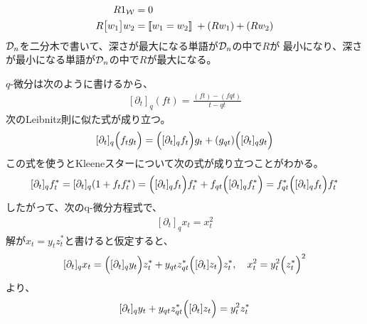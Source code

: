 {\begin{todo}[残りの話題]
\begin{description}
		\begin{equation*}\begin{split}
			R 1_{{\mathcal{W}}} &= 0 \\
			R \bigl[{w_1}\bigr] w_2 &= [\![w_1=w_2]\!]\; + (Rw_1) + (Rw_2) \\
		\end{split}\end{equation*}
		${{\mathcal{D}}}_n$を二分木で書いて、深さが最大になる単語が${{\mathcal{D}}}_n$の中で$R$が
		最小になり、深さが最小になる単語が${{\mathcal{D}}}_n$の中で$R$が最大になる。
		\item[q-微分方程式] $q$-微分は次のように書けるから、
		\begin{equation*}\begin{split}
			[\partial_t]_q(ft) = \frac{(ft) - (fqt)}{t - qt}
		\end{split}\end{equation*}
		次のLeibnitz則に似た式が成り立つ。
		\begin{equation*}\begin{split}
			[\partial_t]_q\Bigl({f_tg_t}\Bigr) = \Bigl({[\partial_t]_qf_t}\Bigr)g_t
			+ (g_{qt})\Bigl({[\partial_t]_qg_t}\Bigr)
		\end{split}\end{equation*}
		この式を使うとKleeneスターについて次の式が成り立つことがわかる。
		\begin{equation*}\begin{split}
			[\partial_t]_qf_t^* = [\partial_t]_q(1 + f_tf_t^*) 
			= \Bigl({[\partial_t]_qf_t}\Bigr)f_t^* + f_{qt}\Bigl({[\partial_t]_qf_t^*}\Bigr) 
			= f_{qt}^*\Bigl({[\partial_t]_qf_t}\Bigr)f_t^*
		\end{split}\end{equation*}
		したがって、次のq-微分方程式で、
		\begin{equation*}\begin{split}
			[\partial_t]_qx_t = x_t^2
		\end{split}\end{equation*}
		解が$x_t=y_tz_t^*$と書けると仮定すると、
		\begin{equation*}\begin{split}
			[\partial_t]_qx_t = \Bigl({[\partial_t]_qy_t}\Bigr)z_t^* 
			+ y_{qt}z_{qt}^*\Bigl({[\partial_t]z_t}\Bigr)z_t^*,\quad
			x_t^2 = y_t^2\Bigl({z_t^*}\Bigr)^2
		\end{split}\end{equation*}
		より、
		\begin{equation*}\begin{split}
			[\partial_t]_qy_t + y_{qt}z_{qt}^*\Bigl({[\partial_t]z_t}\Bigr) = y_t^2z_t^*
		\end{split}\end{equation*}
		\end{description} %
	\end{todo} %

}
